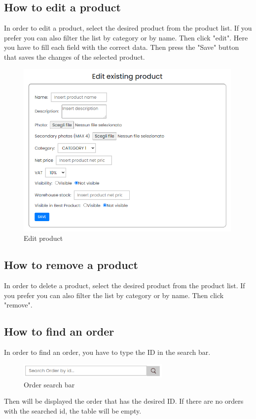 \subsection{How to edit a product}\label{_editProduct}
In order to edit a product, select the desired product from the product list. If you prefer you can also filter the list by category or by name. Then click "edit".
Here you have to fill each field with the correct data. Then press the "Save" button that saves the changes of the selected product.
\begin{figure}[H]
    \centering
    \includegraphics[width=30em]{res/images/venditore/editproduct.png}
    \caption{Edit product}
\end{figure}

\subsection{How to remove a product}\label{_removeProduct}
In order to delete a product, select the desired product from the product list. If you prefer you can also filter the list by category or by name. Then click "remove".

\subsection{How to find an order}\label{_findOrder}
In order to find an order, you have to type the ID in the search bar.
\begin{figure}[H]
    \centering
    \includegraphics[width=20em]{res/images/venditore/ordersearchbar.png}
    \caption{Order search bar}
\end{figure}
Then will be displayed the order that has the desired ID. If there are no orders with the searched id, the table will be empty.


